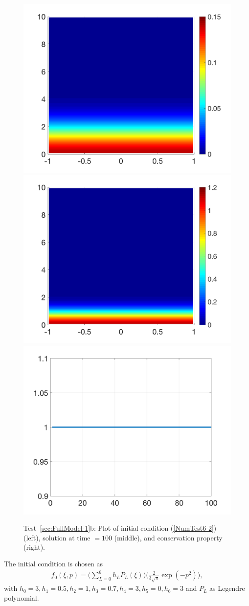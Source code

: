 \documentclass[preprint,11pt]{elsarticle}
\begin{document}
\begin{figure}[H]
\centering
\includegraphics[width=.32\textwidth]{./NumFig/FullModel2D-2-Ini}
\includegraphics[width=.32\textwidth]{./NumFig/FullModel2D-2-100}
\includegraphics[width=.32\textwidth]{./NumFig/FullModel2D-2-Conv}
\caption{Test~\ref{sec:FullModel-1}b: Plot of initial condition (\ref{NumTest6-2}) (left), solution at time $= 100$ (middle), and conservation property (right).}
\end{figure}

The initial condition is chosen as 
\begin{eqnarray}
 f_0(\xi,{p})=\bigg(\sum_{L=0}^6 h_L P_L(\xi)\bigg) \bigg(\frac{2}{3\sqrt{\pi}}\exp(-{p}^2)\bigg), \label{NumTest6-3}
\end{eqnarray}
with $h_0 = 3, h_1=0.5, h_2 = 1, h_3 = 0.7, h_4 = 3, h_5 = 0, h_6 = 3$ and $P_L$ as Legendre polynomial.
\end{document}
